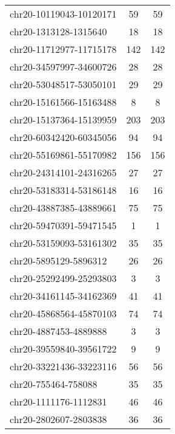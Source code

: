 \begin{longtable}{lSS}
	chr20-10119043-10120171 & 59   & 59                              \\
	chr20-1313128-1315640   & 18   & 18                              \\
	chr20-11712977-11715178 & 142  & 142                             \\
	chr20-34597997-34600726 & 28   & 28                              \\
	chr20-53048517-53050101 & 29   & 29                              \\
	chr20-15161566-15163488 & 8    & 8                               \\
	chr20-15137364-15139959 & 203  & 203                             \\
	chr20-60342420-60345056 & 94   & 94                              \\
	chr20-55169861-55170982 & 156  & 156                             \\
	chr20-24314101-24316265 & 27   & 27                              \\
	chr20-53183314-53186148 & 16   & 16                              \\
	chr20-43887385-43889661 & 75   & 75                              \\
	chr20-59470391-59471545 & 1    & 1                               \\
	chr20-53159093-53161302 & 35   & 35                              \\
	chr20-5895129-5896312   & 26   & 26                              \\
	chr20-25292499-25293803 & 3    & 3                               \\
	chr20-34161145-34162369 & 41   & 41                              \\
	chr20-45868564-45870103 & 74   & 74                              \\
	chr20-4887453-4889888   & 3    & 3                               \\
	chr20-39559840-39561722 & 9    & 9                               \\
	chr20-33221436-33223116 & 56   & 56                              \\
	chr20-755464-758088     & 35   & 35                              \\
	chr20-1111176-1112831   & 46   & 46                              \\
	chr20-2802607-2803838   & 36   & 36                              \\

\end{longtable}
